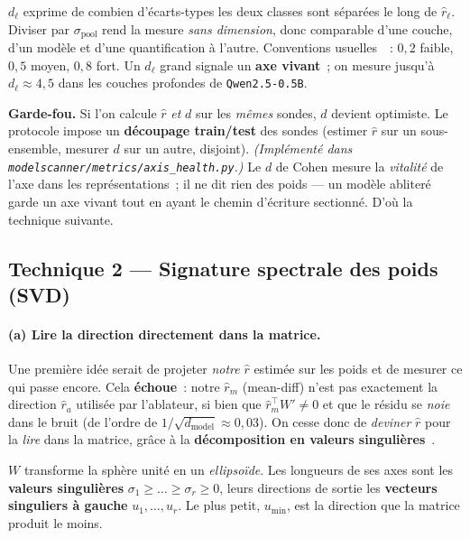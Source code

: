 \documentclass[11pt,a4paper]{article}
\theoremstyle{definition}
\theoremstyle{plain}
\newcommand{\rhat}{\hat{r}}
\newcommand{\dmodel}{d_{\text{model}}}
\begin{document}
\begin{intuition}
$d_\ell$ exprime \og de combien d'écarts-types\fg{} les deux classes sont séparées le
long de $\rhat_\ell$. Diviser par $\sigma_{\text{pool}}$ rend la mesure
\emph{sans dimension}, donc comparable d'une couche, d'un modèle et d'une
quantification à l'autre. Conventions usuelles~\cite{cohen1988}~: $0{,}2$ faible,
$0{,}5$ moyen, $0{,}8$ fort. Un $d_\ell$ grand signale un \textbf{axe vivant}~; on
mesure jusqu'à $d_\ell\approx 4{,}5$ dans les couches profondes de
\texttt{Qwen2.5-0.5B}.
\end{intuition}

\noindent\textbf{Garde-fou.} Si l'on calcule $\rhat$ \emph{et} $d$ sur les
\emph{mêmes} sondes, $d$ devient optimiste. Le protocole impose un \textbf{découpage
train/test} des sondes (estimer $\rhat$ sur un sous-ensemble, mesurer $d$ sur un
autre, disjoint). \emph{(Implémenté dans
\texttt{modelscanner/metrics/axis\_health.py}.)} Le $d$ de Cohen mesure la
\emph{vitalité} de l'axe dans les représentations~; il ne dit rien des poids — un
modèle abliteré garde un axe vivant tout en ayant le chemin d'écriture sectionné.
D'où la technique suivante.

\subsection{Technique 2 — Signature spectrale des poids (SVD)}\label{sec:svd}

\paragraph{(a) Lire la direction directement dans la matrice.}
Une première idée serait de projeter \emph{notre} $\rhat$ estimée sur les poids et de
mesurer ce qui \og passe encore\fg{}. Cela \textbf{échoue}~: notre $\rhat_m$
(mean-diff) n'est pas exactement la direction $\rhat_a$ utilisée par l'ablateur,
si bien que $\rhat_m^\top W'\neq 0$ et que le résidu se \emph{noie} dans le bruit
(de l'ordre de $1/\sqrt{\dmodel}\approx 0{,}03$). On cesse donc de \emph{deviner}
$\rhat$ pour la \emph{lire} dans la matrice, grâce à la \textbf{décomposition en
valeurs singulières}~\cite{golub2013}.

\begin{intuition}
$W$ transforme la sphère unité en un \emph{ellipsoïde}. Les longueurs de ses axes
sont les \textbf{valeurs singulières} $\sigma_1\ge\dots\ge\sigma_r\ge 0$, leurs
directions de sortie les \textbf{vecteurs singuliers à gauche} $u_1,\dots,u_r$. Le
plus petit, $u_{\min}$, est la direction que la matrice \og produit le moins\fg{}.
\end{intuition}
\end{document}
